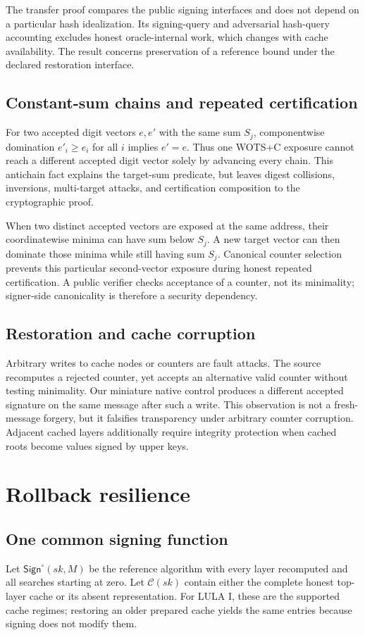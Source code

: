 \documentclass[a4paper,envcountsame,runningheads]{llncs}
\newcommand{\Sign}{\mathsf{Sign}}
\begin{document}
The transfer proof compares the public signing interfaces and does not depend on a particular hash idealization. Its signing-query and adversarial hash-query accounting excludes honest oracle-internal work, which changes with cache availability. The result concerns preservation of a reference bound under the declared restoration interface.

\subsection{Constant-sum chains and repeated certification}
For two accepted digit vectors $e,e'$ with the same sum $S_j$, componentwise domination $e'_i\ge e_i$ for all $i$ implies $e'=e$. Thus one WOTS+C exposure cannot reach a different accepted digit vector solely by advancing every chain. This antichain fact explains the target-sum predicate, but leaves digest collisions, inversions, multi-target attacks, and certification composition to the cryptographic proof.

When two distinct accepted vectors are exposed at the same address, their coordinatewise minima can have sum below $S_j$. A new target vector can then dominate those minima while still having sum $S_j$. Canonical counter selection prevents this particular second-vector exposure during honest repeated certification. A public verifier checks acceptance of a counter, not its minimality; signer-side canonicality is therefore a security dependency.

\subsection{Restoration and cache corruption}
Arbitrary writes to cache nodes or counters are fault attacks. The source recomputes a rejected counter, yet accepts an alternative valid counter without testing minimality. Our miniature native control produces a different accepted signature on the same message after such a write. This observation is not a fresh-message forgery, but it falsifies transparency under arbitrary counter corruption. Adjacent cached layers additionally require integrity protection when cached roots become values signed by upper keys.

\section{Rollback resilience}\label{sec:rollback}
\subsection{One common signing function}
Let $\Sign^\circ(sk,M)$ be the reference algorithm with every layer recomputed and all searches starting at zero. Let $\mathcal C(sk)$ contain either the complete honest top-layer cache or its absent representation. For LULA I, these are the supported cache regimes; restoring an older prepared cache yields the same entries because signing does not modify them.
\end{document}
